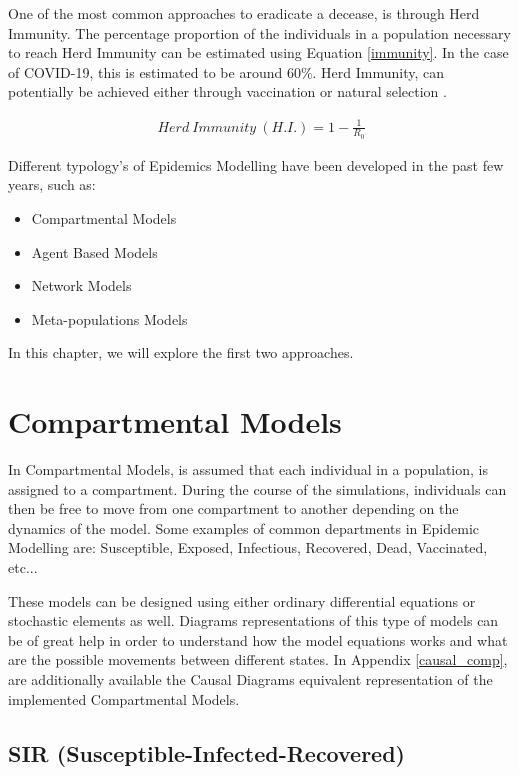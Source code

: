 One of the most common approaches to eradicate a decease, is through Herd Immunity. The percentage proportion of the individuals in a population necessary to reach Herd Immunity can be estimated using Equation \ref{immunity}. In the case of COVID-19, this is estimated to be around 60\%. Herd Immunity, can potentially be achieved either through vaccination or natural selection \cite{blob}.

\useshortskip
\begin{align}
\ Herd\:Immunity\:(H.I.) = 1 - \frac{1}{R_{0}}
\label{immunity}
\end{align}
\useshortskip

Different typology's of Epidemics Modelling have been developed in the past few years, such as:
\begin{itemize}
    \setlength\itemsep{-0.3cm}
    \item Compartmental Models
    \item Agent Based Models
    \item Network Models
    \item Meta-populations Models
\end{itemize}

In this chapter, we will explore the first two approaches.

\section{Compartmental Models}

In Compartmental Models, is assumed that each individual in a population, is assigned to a compartment. During the course of the simulations, individuals can then be free to move from one compartment to another depending on the dynamics of the model. Some examples of common departments in Epidemic Modelling are: Susceptible, Exposed, Infectious, Recovered, Dead, Vaccinated, etc...

These models can be designed using either ordinary differential equations or stochastic elements as well. Diagrams representations of this type of models can be of great help in order to understand how the model equations works and what are the possible movements between different states. In Appendix \ref{causal_comp}, are additionally available the Causal Diagrams equivalent representation of the implemented Compartmental Models. 

\subsection{SIR (Susceptible-Infected-Recovered)}
\label{sir_sec}

